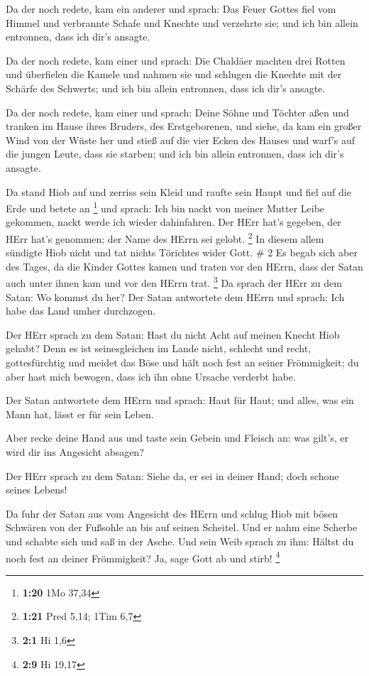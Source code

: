  Da der noch redete, kam ein anderer und sprach: Das Feuer
Gottes fiel vom Himmel und verbrannte Schafe und Knechte und verzehrte
sie; und ich bin allein entronnen, dass ich dir's ansagte.

 Da der noch redete, kam einer und sprach: Die Chaldäer
machten drei Rotten und überfielen die Kamele und nahmen sie und
schlugen die Knechte mit der Schärfe des Schwerts; und ich bin allein
entronnen, dass ich dir's ansagte.

 Da der noch redete, kam einer und sprach: Deine Söhne und
Töchter aßen und tranken im Hause ihres Bruders, des Erstgeborenen,
 und siehe, da kam ein großer Wind von der Wüste her und
stieß auf die vier Ecken des Hauses und warf's auf die jungen Leute,
dass sie starben; und ich bin allein entronnen, dass ich dir's ansagte.

 Da stand Hiob auf und zerriss sein Kleid und raufte sein
Haupt und fiel auf die Erde und betete an \footnote{\textbf{1:20} 1Mo
  37,34}  und sprach: Ich bin nackt von meiner Mutter Leibe
gekommen, nackt werde ich wieder dahinfahren. Der HErr hat's gegeben,
der HErr hat's genommen; der Name des HErrn sei gelobt. \footnote{\textbf{1:21}
  Pred 5,14; 1Tim 6,7}  In diesem allem sündigte Hiob nicht
und tat nichts Törichtes wider Gott. \# 2  Es begab sich
aber des Tages, da die Kinder Gottes kamen und traten vor den HErrn,
dass der Satan auch unter ihnen kam und vor den HErrn trat. \footnote{\textbf{2:1}
  Hi 1,6}  Da sprach der HErr zu dem Satan: Wo kommst du
her? Der Satan antwortete dem HErrn und sprach: Ich habe das Land umher
durchzogen.

 Der HErr sprach zu dem Satan: Hast du nicht Acht auf meinen
Knecht Hiob gehabt? Denn es ist seinesgleichen im Lande nicht, schlecht
und recht, gottesfürchtig und meidet das Böse und hält noch fest an
seiner Frömmigkeit; du aber hast mich bewogen, dass ich ihn ohne Ursache
verderbt habe.

 Der Satan antwortete dem HErrn und sprach: Haut für Haut;
und alles, was ein Mann hat, lässt er für sein Leben.

 Aber recke deine Hand aus und taste sein Gebein und Fleisch
an: was gilt's, er wird dir ins Angesicht absagen?

 Der HErr sprach zu dem Satan: Siehe da, er sei in deiner
Hand; doch schone seines Lebens!

 Da fuhr der Satan aus vom Angesicht des HErrn und schlug
Hiob mit bösen Schwären von der Fußsohle an bis auf seinen Scheitel.
 Und er nahm eine Scherbe und schabte sich und saß in der
Asche.  Und sein Weib sprach zu ihm: Hältst du noch fest an
deiner Frömmigkeit? Ja, sage Gott ab und stirb! \footnote{\textbf{2:9}
  Hi 19,17}

